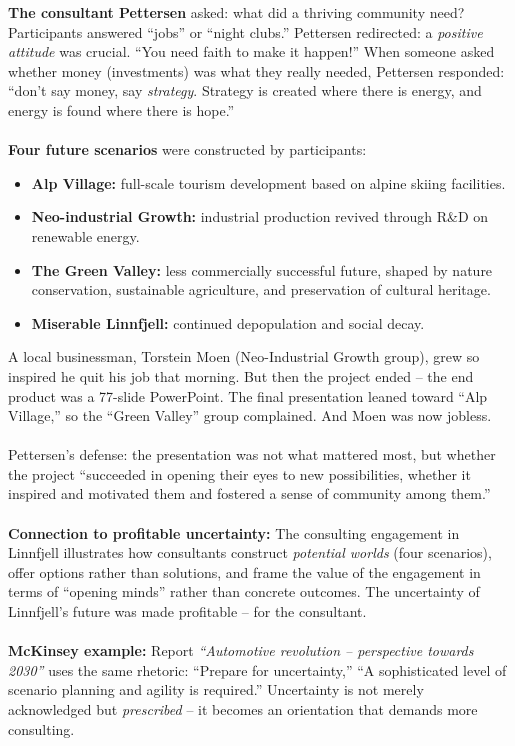 \documentclass[a4paper,12pt]{article}
\begin{document}
\noindent \textbf{The consultant Pettersen} asked: what did a thriving community need? Participants answered ``jobs'' or ``night clubs.'' Pettersen redirected: a \emph{positive attitude} was crucial. ``You need faith to make it happen!'' When someone asked whether money (investments) was what they really needed, Pettersen responded: ``don't say money, say \emph{strategy}. Strategy is created where there is energy, and energy is found where there is hope.'' \\
\\
\noindent \textbf{Four future scenarios} were constructed by participants:
\begin{itemize}
	\item \textbf{Alp Village:} full-scale tourism development based on alpine skiing facilities.
	\item \textbf{Neo-industrial Growth:} industrial production revived through R\&D on renewable energy.
	\item \textbf{The Green Valley:} less commercially successful future, shaped by nature conservation, sustainable agriculture, and preservation of cultural heritage.
	\item \textbf{Miserable Linnfjell:} continued depopulation and social decay.
\end{itemize}

\noindent A local businessman, Torstein Moen (Neo-Industrial Growth group), grew so inspired he quit his job that morning. But then the project ended -- the end product was a 77-slide PowerPoint. The final presentation leaned toward ``Alp Village,'' so the ``Green Valley'' group complained. And Moen was now jobless. \\
\\
\noindent Pettersen's defense: the presentation was not what mattered most, but whether the project ``succeeded in opening their eyes to new possibilities, whether it inspired and motivated them and fostered a sense of community among them.'' \\
\\
\noindent \textbf{Connection to profitable uncertainty:} The consulting engagement in Linnfjell illustrates how consultants construct \emph{potential worlds} (four scenarios), offer options rather than solutions, and frame the value of the engagement in terms of ``opening minds'' rather than concrete outcomes. The uncertainty of Linnfjell's future was made profitable -- for the consultant. \\
\\
\noindent \textbf{McKinsey example:} Report \emph{``Automotive revolution -- perspective towards 2030''} uses the same rhetoric: ``Prepare for uncertainty,'' ``A sophisticated level of scenario planning and agility is required.'' Uncertainty is not merely acknowledged but \emph{prescribed} -- it becomes an orientation that demands more consulting. \\
\end{document}
